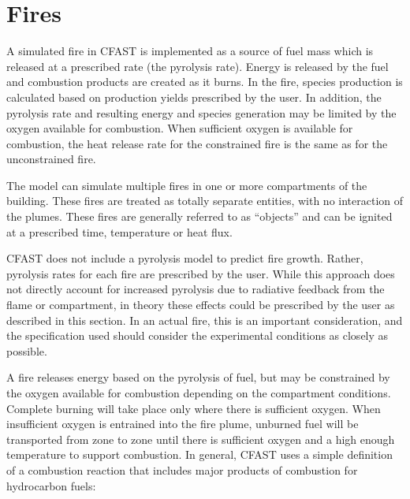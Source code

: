 


\chapter{Fires}

A simulated fire in CFAST is implemented as a source of fuel mass which is released at a prescribed rate (the pyrolysis rate). Energy is released by the fuel and combustion products are created as it burns. In the fire, species production is calculated based on production yields prescribed by the user. In addition, the pyrolysis rate and resulting energy and species generation may be limited by the oxygen available for combustion. When sufficient oxygen is available for combustion, the heat release rate for the constrained fire is the same as for the unconstrained fire.

The model can simulate multiple fires in one or more compartments of the building.  These fires are treated as totally separate entities, with no interaction of the plumes. These fires are generally referred to as “objects” and can be ignited at a prescribed time, temperature or heat flux.

CFAST does not include a pyrolysis model to predict fire growth. Rather, pyrolysis rates for each fire are prescribed by the user.  While this approach does not directly account for increased pyrolysis due to radiative feedback from the flame or compartment, in theory these effects could be prescribed by the user as described in this section.  In an actual fire, this is an important consideration, and the specification used should consider the experimental conditions as closely as possible.

A fire releases energy based on the pyrolysis of fuel, but may be constrained by the oxygen available for combustion depending on the compartment conditions. Complete burning will take place only where there is sufficient oxygen.  When insufficient oxygen is entrained into the fire plume, unburned fuel will be transported from zone to zone until there is sufficient oxygen and a high enough temperature to support combustion.  In general, CFAST uses a simple definition of a combustion reaction that includes major products of combustion for hydrocarbon fuels:

